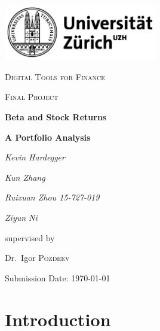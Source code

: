 \documentclass[12pt,a4paper,abstracton,fleqn]{article}
\begin{document}
\begin{titlepage}
	\centering
	\includegraphics[width=0.5\textwidth]{UZH LOGO.png}\par\vspace{1cm}
	{\scshape\LARGE Digital Tools for Finance \par}
	\vspace{1cm}
	{\scshape\Large Final Project\par}
	\vspace{1.5cm}
	{\huge\bfseries Beta and Stock Returns\par}
	{\large\bfseries A Portfolio Analysis\par}
	\vspace{2cm}
	\leftline
	{\Large\itshape Kevin Hardegger\par}
	\vspace{1cm}
	\leftline
	{\Large\itshape Kun Zhang\par}
	\vspace{1cm}
	\leftline
	{\Large\itshape Ruixuan Zhou    15-727-019\par}
	\vspace{1cm}
	\leftline
	{\Large\itshape Ziyun Ni\par}
	\vspace{1cm}
	\vfill\large
	supervised by\par
	Dr.~Igor \textsc{Pozdeev}

	\vfill

    \vspace{1cm}
	{\large Submission Date: \today\par}
\end{titlepage}

\renewcommand*\contentsname{Table of Contents}
\tableofcontents
{}
\vspace{1cm}
\listoffigures
\vspace{1cm}
\listoftables

\newpage
\setcounter{page}{1}


\section{Introduction}
\end{document}
